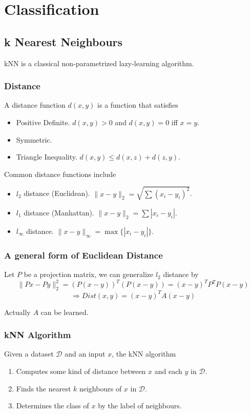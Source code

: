 \chapter{Classification}
\newpage


\section{k Nearest Neighbours}
    kNN is a classical non-parametrized lazy-learning algorithm.

    \subsection{Distance}
        A distance function $d(x,y)$ is a function that satisfies
        \begin{itemize}
            \item Positive Definite. $d(x,y)>0$ and $d(x,y)=0$ iff $x=y$.
            \item Symmetric.
            \item Triangle Inequality. $d(x,y) \le d(x,z) + d(z,y)$.
        \end{itemize}
        Common distance functions include
        \begin{itemize}
            \item $l_2$ distance (Euclidean). $\|x-y\|_2 = \sqrt{\sum(x_i - y_i)^2}$.
            \item $l_1$ distance (Manhattan). $\|x-y\|_2 = \sum |x_i-y_i|$.
            \item $l_{\infty}$ distance. $\|x-y\|_{\infty} = \max\{|x_i-y_i|\}$.
        \end{itemize}

    \subsection{A general form of Euclidean Distance}
        Let $P$ be a projection matrix, we can generalize $l_2$ distance by
        \[\|Px-Py\|_2^2 = (P(x-y))^T(P(x-y)) = (x-y)^TP^TP(x-y)\]
        \[\Rightarrow Dist(x,y) = (x-y)^TA(x-y)\]
        \begin{remark}
            Actually $A$ can be learned.
        \end{remark}

    \subsection{kNN Algorithm}
        Given a dataset $\mathcal{D}$ and an input $x$, the kNN algorithm
        \begin{enumerate}
            \item Computes some kind of distance between $x$ and each $y$ in $\mathcal{D}$.
            \item Finds the nearest $k$ neighbours of $x$ in $\mathcal{D}$.
            \item Determines the class of $x$ by the label of neighbours.
        \end{enumerate}

